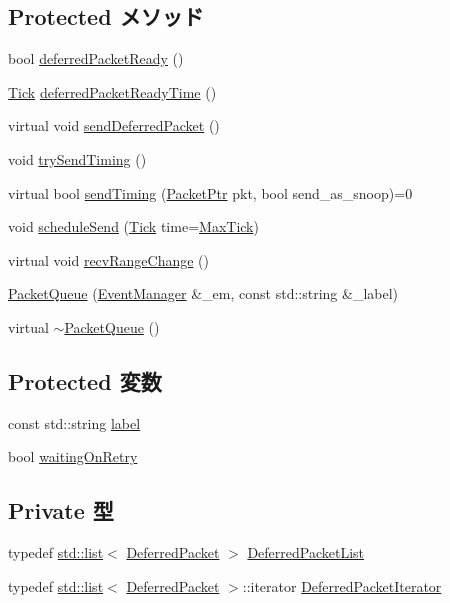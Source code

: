 \subsection*{Protected メソッド}
\begin{DoxyCompactItemize}
\item 
bool \hyperlink{classPacketQueue_a052ea90ae061f6d3b53d6dee3b3076f3}{deferredPacketReady} ()
\item 
\hyperlink{base_2types_8hh_a5c8ed81b7d238c9083e1037ba6d61643}{Tick} \hyperlink{classPacketQueue_a9a43740cba452beb76e08a890f59c70d}{deferredPacketReadyTime} ()
\item 
virtual void \hyperlink{classPacketQueue_a3ce3f4b79c2caf000124b3de8ba9157c}{sendDeferredPacket} ()
\item 
void \hyperlink{classPacketQueue_a391c414b53eb45782e37bc539608e477}{trySendTiming} ()
\item 
virtual bool \hyperlink{classPacketQueue_a3111a75f1ac04df57de8a34ded64a82d}{sendTiming} (\hyperlink{classPacket}{PacketPtr} pkt, bool send\_\-as\_\-snoop)=0
\item 
void \hyperlink{classPacketQueue_a34d5599fd6c275e889527628932a224e}{scheduleSend} (\hyperlink{base_2types_8hh_a5c8ed81b7d238c9083e1037ba6d61643}{Tick} time=\hyperlink{base_2types_8hh_abe940b1b328825e234da719447e15ca5}{MaxTick})
\item 
virtual void \hyperlink{classPacketQueue_af60d9c2c17fb4c9ebc5384a7e0c9f289}{recvRangeChange} ()
\item 
\hyperlink{classPacketQueue_aa30b1ba397193e7094a87b2a945f7237}{PacketQueue} (\hyperlink{classEventManager}{EventManager} \&\_\-em, const std::string \&\_\-label)
\item 
virtual \hyperlink{classPacketQueue_a3efbe442356f38106e0b67f41070245a}{$\sim$PacketQueue} ()
\end{DoxyCompactItemize}
\subsection*{Protected 変数}
\begin{DoxyCompactItemize}
\item 
const std::string \hyperlink{classPacketQueue_ae471a4c4073716b769170188214fe93d}{label}
\item 
bool \hyperlink{classPacketQueue_ad4363dd8230c71676c4cad8dd5a0b8a7}{waitingOnRetry}
\end{DoxyCompactItemize}
\subsection*{Private 型}
\begin{DoxyCompactItemize}
\item 
typedef \hyperlink{classstd_1_1list}{std::list}$<$ \hyperlink{classPacketQueue_1_1DeferredPacket}{DeferredPacket} $>$ \hyperlink{classPacketQueue_ae5fc25ae70b3044ebae593494f7f58c8}{DeferredPacketList}
\item 
typedef \hyperlink{classstd_1_1list}{std::list}$<$ \hyperlink{classPacketQueue_1_1DeferredPacket}{DeferredPacket} $>$::iterator \hyperlink{classPacketQueue_ad01f0c4d4677a8aeea2433ba7ef9f6fd}{DeferredPacketIterator}
\end{DoxyCompactItemize}
